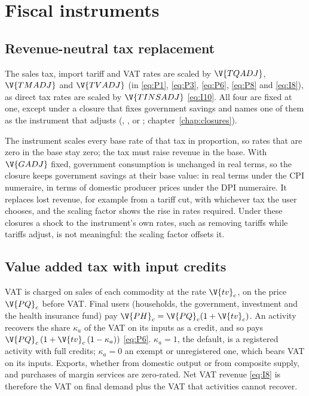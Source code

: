 \chapter{Fiscal instruments}\label{chap:fiscal}

\section{Revenue-neutral tax replacement}\label{sec:replacement}

The sales tax, import tariff and VAT rates are scaled by $\V{TQADJ}$,
$\V{TMADJ}$ and $\V{TVADJ}$ (in \eqref{eq:P1}, \eqref{eq:P3}, \eqref{eq:P6},
\eqref{eq:P8} and \eqref{eq:I8}), as direct tax rates are scaled by
$\V{TINSADJ}$ \eqref{eq:I10}. All four are fixed at one, except under a closure
that fixes government savings and names one of them as the instrument that
adjusts (, ,
 or ; chapter~\ref{chap:closures}).

The instrument scales every base rate of that tax in proportion, so rates that
are zero in the base stay zero; the tax must raise revenue in the base. With
$\V{GADJ}$ fixed, government consumption is unchanged in real terms, so the
closure keeps government savings at their base value: in real terms under the
CPI numeraire, in terms of domestic producer prices under the DPI numeraire.
It replaces lost revenue, for example from a tariff cut, with whichever tax
the user chooses, and the scaling factor shows the rise in rates required.
Under these closures a shock to the instrument's own rates, such as removing
tariffs while tariffs adjust, is not meaningful: the scaling factor offsets
it.

\section{Value added tax with input credits}\label{sec:vat}

VAT is charged on sales of each commodity at the rate $\V{tv}_c$, on the price
$\V{PQ}_c$ before VAT. Final users (households, the government, investment and
the health insurance fund) pay $\V{PH}_c = \V{PQ}_c(1 + \V{tv}_c)$. An activity
recovers the share $\kappa_a$ of the VAT on its inputs as a credit, and so pays
$\V{PQ}_c\,(1 + \V{tv}_c\,(1 - \kappa_a))$ \eqref{eq:P6}. $\kappa_a = 1$, the
default, is a registered activity with full credits; $\kappa_a = 0$ an exempt
or unregistered one, which bears VAT on its inputs. Exports, whether from
domestic output or from composite supply, and purchases of margin services
are zero-rated. Net VAT revenue \eqref{eq:I8} is therefore the VAT on final
demand plus the VAT that activities cannot recover.

